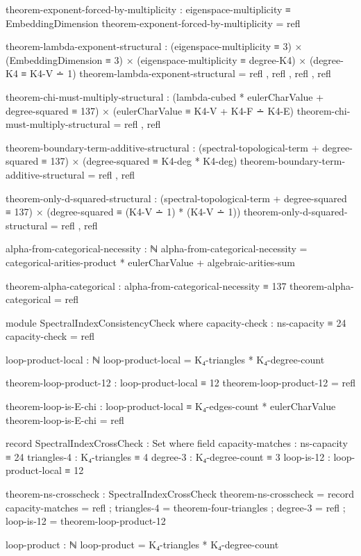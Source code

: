 \documentclass[11pt,a4paper]{book}
\begin{document}
\begin{code}
theorem-exponent-forced-by-multiplicity : eigenspace-multiplicity ≡ EmbeddingDimension
theorem-exponent-forced-by-multiplicity = refl

theorem-lambda-exponent-structural : 
  (eigenspace-multiplicity ≡ 3) × (EmbeddingDimension ≡ 3) ×
  (eigenspace-multiplicity ≡ degree-K4) × (degree-K4 ≡ K4-V ∸ 1)
theorem-lambda-exponent-structural = refl , refl , refl , refl

theorem-chi-must-multiply-structural : 
  (lambda-cubed * eulerCharValue + degree-squared ≡ 137) ×
  (eulerCharValue ≡ K4-V + K4-F ∸ K4-E)
theorem-chi-must-multiply-structural = refl , refl

theorem-boundary-term-additive-structural : 
  (spectral-topological-term + degree-squared ≡ 137) ×
  (degree-squared ≡ K4-deg * K4-deg)
theorem-boundary-term-additive-structural = refl , refl

theorem-only-d-squared-structural : 
  (spectral-topological-term + degree-squared ≡ 137) ×
  (degree-squared ≡ (K4-V ∸ 1) * (K4-V ∸ 1))
theorem-only-d-squared-structural = refl , refl

alpha-from-categorical-necessity : ℕ
alpha-from-categorical-necessity = categorical-arities-product * eulerCharValue + algebraic-arities-sum

theorem-alpha-categorical : alpha-from-categorical-necessity ≡ 137
theorem-alpha-categorical = refl

module SpectralIndexConsistencyCheck where
  capacity-check : ns-capacity ≡ 24
  capacity-check = refl
  
  loop-product-local : ℕ
  loop-product-local = K₄-triangles * K₄-degree-count
  
  theorem-loop-product-12 : loop-product-local ≡ 12
  theorem-loop-product-12 = refl
  
  theorem-loop-is-E-chi : loop-product-local ≡ K₄-edges-count * eulerCharValue
  theorem-loop-is-E-chi = refl
  
  record SpectralIndexCrossCheck : Set where
    field
      capacity-matches : ns-capacity ≡ 24
      triangles-4      : K₄-triangles ≡ 4
      degree-3         : K₄-degree-count ≡ 3
      loop-is-12       : loop-product-local ≡ 12
  
  theorem-ns-crosscheck : SpectralIndexCrossCheck
  theorem-ns-crosscheck = record
    { capacity-matches = refl
    ; triangles-4      = theorem-four-triangles
    ; degree-3         = refl
    ; loop-is-12       = theorem-loop-product-12
    }

loop-product : ℕ
loop-product = K₄-triangles * K₄-degree-count


\end{code}
\end{document}
